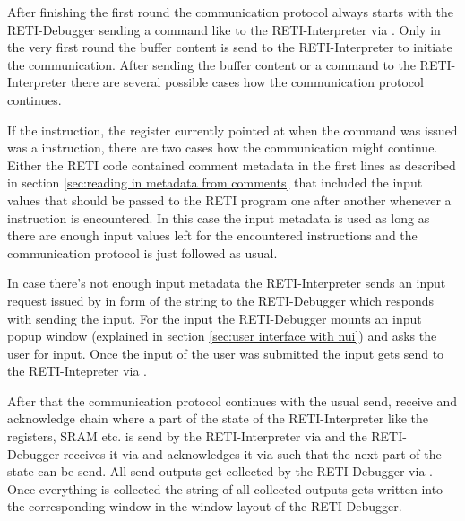 \documentclass{report}
\begin{document}
After finishing the first round the communication protocol always starts with the RETI-Debugger sending a command like  to the RETI-Interpreter via . Only in the very first round the buffer content is send to the RETI-Interpreter to initiate the communication. After sending the buffer content or a command to the RETI-Interpreter there are several possible cases how the communication protocol continues.

If the instruction, the  register currently pointed at when the  command was issued was a  instruction, there are two cases how the communication might continue. Either the RETI code contained \alert{comment metadata} in the first lines as described in section \ref{sec:reading in metadata from comments} that included the input values that should be passed to the RETI program one after another whenever a  instruction is encountered. In this case the input metadata is used as long as there are enough input values left for the encountered  instructions and the communication protocol is just followed as usual.

In case there's not enough input metadata the RETI-Interpreter sends an input request issued by  in form of the string  to the RETI-Debugger which responds with sending the input. For the input the RETI-Debugger mounts an input popup window (explained in section \ref{sec:user interface with nui}) and asks the user for input. Once the input of the user was submitted the input gets send to the RETI-Intepreter via .

After that the communication protocol continues with the usual send, receive and acknowledge chain where a part of the state of the RETI-Interpreter like the registers, SRAM etc. is send by the RETI-Interpreter via  and the RETI-Debugger receives it via  and acknowledges it via  such that the next part of the state can be send. All send outputs get collected by the RETI-Debugger via . Once everything is collected the  string of all collected outputs gets written into the corresponding window in the window layout of the RETI-Debugger.
\end{document}
